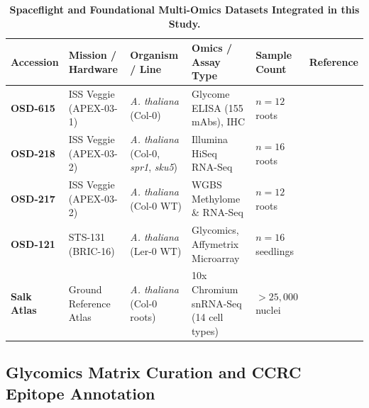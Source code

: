 \begin{table}[t]
\centering
\small
\caption{\textbf{Spaceflight and Foundational Multi-Omics Datasets Integrated in this Study.}}
\label{tab:veggie_studies}
\begin{tabular}{llllll}
\hline
\textbf{Accession} & \textbf{Mission / Hardware} & \textbf{Organism / Line} & \textbf{Omics / Assay Type} & \textbf{Sample Count} & \textbf{Reference} \\
\hline
\textbf{OSD-615} & ISS Veggie (APEX-03-1) & \textit{A. thaliana} (Col-0) & Glycome ELISA (155 mAbs), IHC & $n = 12$ roots & \cite{Nakashima2023} \\
\textbf{OSD-218} & ISS Veggie (APEX-03-2) & \textit{A. thaliana} (Col-0, \textit{spr1}, \textit{sku5}) & Illumina HiSeq RNA-Seq & $n = 16$ roots & \cite{Califar2020} \\
\textbf{OSD-217} & ISS Veggie (APEX-03-2) & \textit{A. thaliana} (Col-0 WT) & WGBS Methylome \& RNA-Seq & $n = 12$ roots & \cite{Zhou2019} \\
\textbf{OSD-121} & STS-131 (BRIC-16) & \textit{A. thaliana} (Ler-0 WT) & Glycomics, Affymetrix Microarray & $n = 16$ seedlings & \cite{Paul2012_BRIC16} \\
\textbf{Salk Atlas} & Ground Reference Atlas & \textit{A. thaliana} (Col-0 roots) & 10x Chromium snRNA-Seq (14 cell types) & $>25,000$ nuclei & \cite{Lee2025} \\
\hline
\end{tabular}
\end{table}

\subsection{Glycomics Matrix Curation and CCRC Epitope Annotation}

